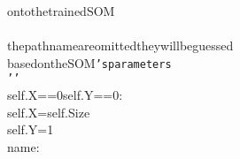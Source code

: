 {{\begin{tabbing}
\hspace{96pt}onto\hspace{6pt}the\hspace{6pt}trained\hspace{6pt}SOM\\
\hspace{72pt}\\
\hspace{6pt}the\hspace{6pt}path\hspace{6pt}name\hspace{6pt}are\hspace{6pt}omitted\hspace{6pt}they\hspace{6pt}will\hspace{6pt}be\hspace{6pt}guessed\hspace{6pt}\\
\hspace{72pt}based\hspace{6pt}on\hspace{6pt}the\hspace{6pt}SOM{\texttt{{'}s\hspace{6pt}parameters}}\\
{\texttt{\hspace{48pt}{'}}}{\texttt{{'}{'}}}\\
\hspace{6pt}self.X\hspace{6pt}==\hspace{6pt}0\hspace{6pt}self.Y\hspace{6pt}==\hspace{6pt}0:\\
\hspace{72pt}self.X\hspace{6pt}=\hspace{6pt}self.Size\\
\hspace{72pt}self.Y\hspace{6pt}=\hspace{6pt}1\\
\hspace{6pt}name:\\

\end{tabbing}}}

